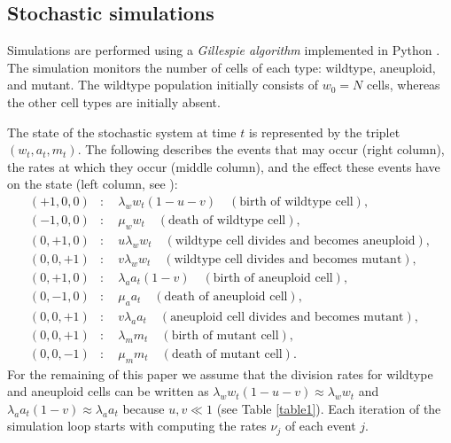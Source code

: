 \documentclass[12pt]{extarticle}
\begin{document}
\subsection*{Stochastic simulations} 
Simulations are performed using a \emph{Gillespie algorithm} \citep{gillespie1976general,gillespie1977exact} implemented in Python \citep{python}.
The simulation monitors the number of cells of each type: wildtype, aneuploid, and mutant. 
The wildtype population initially consists of $w_0=N$ cells, whereas the other cell types are initially absent.

The state of the stochastic system at time $t$ is represented by the triplet $\left(w_t,a_t,m_t\right)$. The following describes the events that may occur (right column), the rates at which they occur (middle column), and the effect these events have on the state (left column, see ):
\begin{subequations}
\begin{flalign*}
(+1,0,0)&:\quad \lambda_ww_t\left(1-u-v\right)\quad\left(\text{birth of wildtype cell}\right),\\
(-1,0,0)&:\quad \mu_ww_t\quad\left(\text{death of wildtype cell}\right),\\
(0,+1,0)&:\quad u\lambda_ww_t\quad\left(\text{wildtype cell divides and becomes aneuploid}\right),\\
(0,0,+1)&:\quad v\lambda_ww_t\quad\left(\text{wildtype cell divides and becomes mutant}\right),\\
(0,+1,0)&:\quad \lambda_aa_t\left(1-v\right)\quad\left(\text{birth of aneuploid cell}\right),\\
(0,-1,0)&:\quad \mu_aa_t\quad\left(\text{death of aneuploid cell}\right),\\
(0,0,+1)&:\quad v\lambda_aa_t\quad\left(\text{aneuploid cell divides and becomes mutant}\right),\\
(0,0,+1)&:\quad \lambda_mm_t\quad\left(\text{birth of mutant cell}\right),\\
(0,0,-1)&:\quad \mu_mm_t\quad\left(\text{death of mutant cell}\right).
\end{flalign*}
\end{subequations}
For the remaining of this paper we assume that the division rates for wildtype and aneuploid cells can be written as $\lambda_ww_t\left(1-u-v\right)\approx \lambda_ww_t$ and $\lambda_aa_t\left(1-v\right)\approx\lambda_aa_t$ because $u,v\ll1$ (see Table \ref{table1}).
Each iteration of the simulation loop starts with computing the rates $\nu_j$ of each event $j$.
\end{document}
